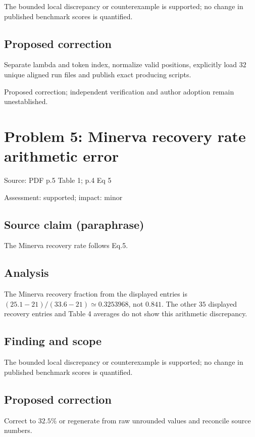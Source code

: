 \documentclass[11pt]{article}
\begin{document}
The bounded local discrepancy or counterexample is supported; no change in published benchmark scores is quantified.

\subsection*{Proposed correction}

Separate lambda and token index, normalize valid positions, explicitly load \(32\) unique aligned run files and publish exact producing scripts.

Proposed correction; independent verification and author adoption remain unestablished.

\section*{Problem 5: Minerva recovery rate arithmetic error}

Source: PDF p.5 Table 1; p.4 Eq 5

Assessment: supported; impact: minor

\subsection*{Source claim (paraphrase)}

The Minerva recovery rate follows Eq.5.

\subsection*{Analysis}

The Minerva recovery fraction from the displayed entries is \((25.1-21)/(33.6-21)\simeq0.3253968\), not \(0.841\). The other \(35\) displayed recovery entries and Table 4 averages do not show this arithmetic discrepancy.

\subsection*{Finding and scope}

The bounded local discrepancy or counterexample is supported; no change in published benchmark scores is quantified.

\subsection*{Proposed correction}

Correct to \(32.5\%\) or regenerate from raw unrounded values and reconcile source numbers.
\end{document}

